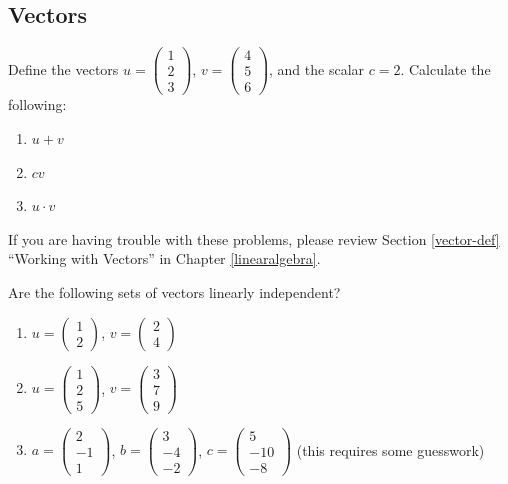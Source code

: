 \documentclass[]{book}
\providecommand{\tightlist}{%
  \setlength{\itemsep}{0pt}\setlength{\parskip}{0pt}}
\theoremstyle{definition}
\theoremstyle{definition}
\theoremstyle{definition}
\theoremstyle{remark}
\begin{document}
\hypertarget{vectors}{%
\subsection*{Vectors}\label{vectors}}

Define the vectors \(u = \begin{pmatrix} 1 \\2 \\3 \end{pmatrix}\), \(v = \begin{pmatrix} 4\\5\\6 \end{pmatrix}\), and the scalar \(c = 2\). Calculate the following:

\begin{enumerate}
\def\labelenumi{\arabic{enumi}.}
\tightlist
\item
  \(u + v\)
\item
  \(cv\)
\item
  \(u \cdot v\)
\end{enumerate}

If you are having trouble with these problems, please review Section \ref{vector-def} ``Working with Vectors'' in Chapter \ref{linearalgebra}.

Are the following sets of vectors linearly independent?

\begin{enumerate}
\def\labelenumi{\arabic{enumi}.}
\item
  \(u = \begin{pmatrix} 1\\ 2\end{pmatrix}\), \(v = \begin{pmatrix} 2\\4\end{pmatrix}\)
\item
  \(u = \begin{pmatrix} 1\\ 2\\ 5 \end{pmatrix}\), \(v = \begin{pmatrix} 3\\ 7\\ 9 \end{pmatrix}\)
\item
  \(a = \begin{pmatrix} 2\\ -1\\ 1 \end{pmatrix}\), \(b = \begin{pmatrix} 3\\ -4\\ -2 \end{pmatrix}\), \(c = \begin{pmatrix} 5\\ -10\\ -8 \end{pmatrix}\) (this requires some guesswork)
\end{enumerate}
\end{document}

